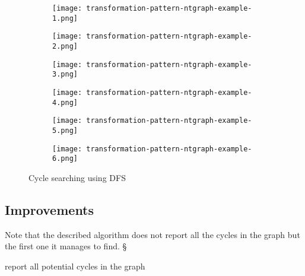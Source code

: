 \begin{figure}[H]
\begin{subfigure}{0.32\linewidth}
	\centering
	\texttt{[image: transformation-pattern-ntgraph-example-1.png]}
	\caption{}
\end{subfigure}
\begin{subfigure}{0.32\linewidth}
	\centering
	\texttt{[image: transformation-pattern-ntgraph-example-2.png]}
	\caption{}
\end{subfigure}
\begin{subfigure}{0.32\linewidth}
	\centering
	\texttt{[image: transformation-pattern-ntgraph-example-3.png]}
	\caption{}
\end{subfigure}

\begin{subfigure}{0.32\linewidth}
	\centering
	\texttt{[image: transformation-pattern-ntgraph-example-4.png]}
	\caption{}
\end{subfigure}
\begin{subfigure}{0.32\linewidth}
	\centering
	\texttt{[image: transformation-pattern-ntgraph-example-5.png]}
	\caption{}
\end{subfigure}
\begin{subfigure}{0.32\linewidth}
	\centering
	\texttt{[image: transformation-pattern-ntgraph-example-6.png]}
	\caption{}
\end{subfigure}
\label{ntcycle-dfs-example}
\caption{Cycle searching using DFS}
\end{figure}
\subsection{Improvements}
Note that the described algorithm does not report all the cycles in the graph but the first one it manages to find. §

report all potential cycles in the graph
